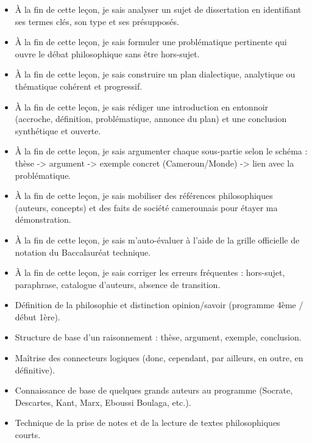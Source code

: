 \documentclass[11pt]{article}
\begin{document}
\begin{objectifs}
\begin{itemize}
\item À la fin de cette leçon, je sais analyser un sujet de dissertation en identifiant ses termes clés, son type et ses présupposés.
\item À la fin de cette leçon, je sais formuler une problématique pertinente qui ouvre le débat philosophique sans être hors-sujet.
\item À la fin de cette leçon, je sais construire un plan dialectique, analytique ou thématique cohérent et progressif.
\item À la fin de cette leçon, je sais rédiger une introduction en entonnoir (accroche, définition, problématique, annonce du plan) et une conclusion synthétique et ouverte.
\item À la fin de cette leçon, je sais argumenter chaque sous-partie selon le schéma : thèse -> argument -> exemple concret (Cameroun/Monde) -> lien avec la problématique.
\item À la fin de cette leçon, je sais mobiliser des références philosophiques (auteurs, concepts) et des faits de société camerounais pour étayer ma démonstration.
\item À la fin de cette leçon, je sais m'auto-évaluer à l'aide de la grille officielle de notation du Baccalauréat technique.
\item À la fin de cette leçon, je sais corriger les erreurs fréquentes : hors-sujet, paraphrase, catalogue d'auteurs, absence de transition.
\end{itemize}
\end{objectifs}

\begin{prerequis}
\begin{itemize}
\item Définition de la philosophie et distinction opinion/savoir (programme 4ème / début 1ère).
\item Structure de base d'un raisonnement : thèse, argument, exemple, conclusion.
\item Maîtrise des connecteurs logiques (donc, cependant, par ailleurs, en outre, en définitive).
\item Connaissance de base de quelques grands auteurs au programme (Socrate, Descartes, Kant, Marx, Eboussi Boulaga, etc.).
\item Technique de la prise de notes et de la lecture de textes philosophiques courts.
\end{itemize}
\end{prerequis}
\end{document}
